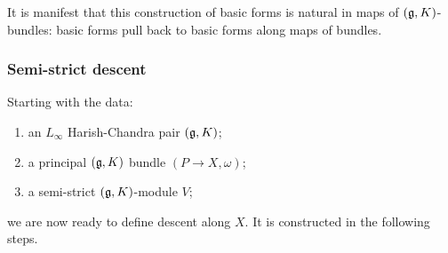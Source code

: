 It is manifest that this construction of basic forms is natural in maps of $(\mathfrak g,K)$-bundles: basic forms pull back to basic forms along maps of bundles.

\subsubsection{Semi-strict descent}

Starting with the data:
\begin{enumerate}
\item an $L_\infty$ Harish-Chandra pair $(\mathfrak g,K)$;
\item a principal $(\mathfrak g,K)$ bundle $(P \to X, \omega)$;
\item a semi-strict $(\mathfrak g,K)$-module $V$;
\end{enumerate}
we are now ready to define descent along $X$. 
It is constructed in the following steps.

